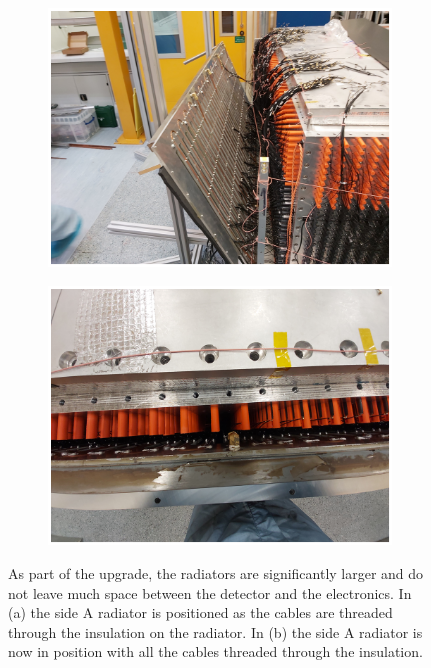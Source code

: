 \begin{figure}[!h]
\centering
\begin{subfigure}{.5\textwidth}
  \centering
  \includegraphics[width=\linewidth]{Chapter3/Figs/Raster/detCon026b_HaningOffRadiator.png}
  \captionsetup{width=.9\linewidth}
  \caption{}
  \label{subFig:detCon026b_HaningOffRadiator}
\end{subfigure}%
\begin{subfigure}{.5\textwidth}
  \centering
  \includegraphics[width=\linewidth]{Chapter3/Figs/Raster/detCon028b_RadiatorTopDown.png}
  \captionsetup{width=.9\linewidth}
  \caption{}
  \label{subFig:detCon028b_RadiatorTopDown}
\end{subfigure}
\caption{As part of the upgrade, the radiators are significantly larger and do not leave much space between the detector and the electronics. In (a) the side A radiator is positioned as the cables are threaded through the insulation on the radiator. In (b) the side A radiator is now in position with all the cables threaded through the insulation.}
\label{fig:detCon_HaningOffRadiator_RadiatorTopDown}
\end{figure}

